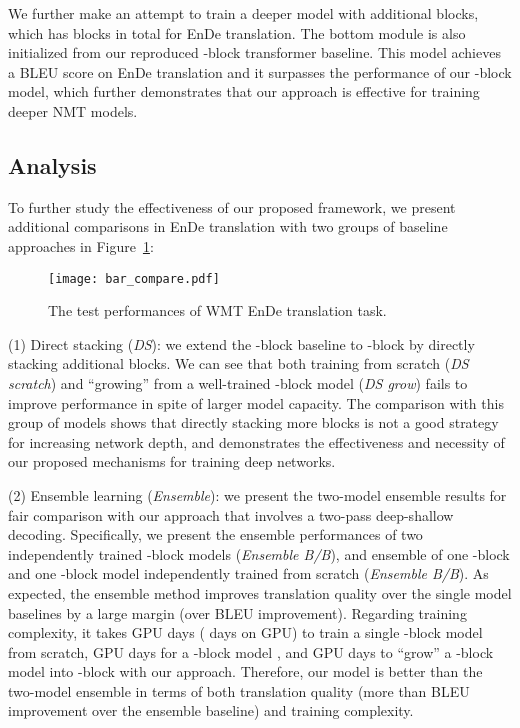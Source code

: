\documentclass[11pt,a4paper]{article}
\begin{document}
We further make an attempt to train a deeper model with additional  blocks, which has  blocks in total for EnDe translation. The bottom module is also initialized from our reproduced -block transformer baseline. This model achieves a  BLEU score on EnDe translation and it surpasses the performance of our -block model, which further demonstrates that our approach is effective for training deeper NMT models. 


\subsection{Analysis}
\label{subsec:analysis}
To further study the effectiveness of our proposed framework, we present additional comparisons in EnDe translation with two groups of baseline approaches in Figure~\ref{fig:results-study}:

\begin{figure}[!tb]
    \centering
    \texttt{[image: bar\_compare.pdf]}
    \caption{The test performances of WMT EnDe translation task.}
    \label{fig:results-study}
\end{figure}

\noindent (1) Direct stacking ({\em DS}): we extend the -block baseline to -block by directly stacking  additional blocks. 
We can see that both training from scratch ({\em DS scratch}) and ``growing'' from a well-trained -block model ({\em DS grow}) fails to improve performance in spite of larger model capacity. The comparison with this group of models shows that directly stacking more blocks is not a good strategy for increasing network depth, and demonstrates the effectiveness and necessity of our proposed mechanisms for training deep networks.

\noindent (2) Ensemble learning ({\em Ensemble}): we present the two-model ensemble results for fair comparison with our approach that involves a two-pass deep-shallow decoding. Specifically, we present the ensemble performances of two independently trained -block models ({\em Ensemble B/B}), and ensemble of one -block and one -block model independently trained from scratch ({\em Ensemble B/B}). As expected, the ensemble method improves translation quality over the single model baselines by a large margin (over  BLEU improvement). Regarding training complexity, it takes  GPU days ( days on  GPU) to train a single -block model from scratch,  GPU days for a -block model , and  GPU days to ``grow'' a -block model into -block with our approach. Therefore, our model is better than the two-model ensemble in terms of both translation quality (more than  BLEU improvement over the ensemble baseline) and training complexity. 
\end{document}
